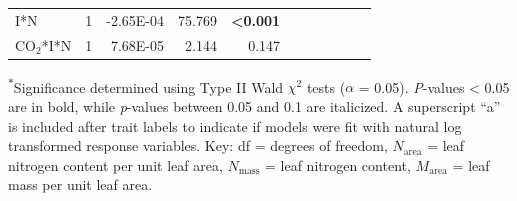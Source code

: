 \begin{landscape}
\begin{table}
{\begin{tabular}{p{3cm}p{0.5cm}p{1.75cm}p{1.5cm}p{1.5cm}p{1.75cm}p{1.5cm}p{1.5cm}p{1.75cm}p{1.5cm}p{1.5cm}}
            I*N & \multicolumn{1}{r}{1}
            & \multicolumn{1}{r}{-2.65E-04} & \multicolumn{1}{r}{ 75.769}   & \multicolumn{1}{r}{\textbf{<0.001}}
            & \multicolumn{1}{r}{}          & \multicolumn{1}{r}{}          & \multicolumn{1}{r}{}
            & \multicolumn{1}{r}{}          & \multicolumn{1}{r}{}          & \multicolumn{1}{r}{} 
            \\

            CO$_2$*I*N & \multicolumn{1}{r}{1}
            & \multicolumn{1}{r}{7.68E-05}  & \multicolumn{1}{r}{  2.144}   & \multicolumn{1}{r}{0.147}
            & \multicolumn{1}{r}{}          & \multicolumn{1}{r}{}          & \multicolumn{1}{r}{}
            & \multicolumn{1}{r}{}          & \multicolumn{1}{r}{}          & \multicolumn{1}{r}{} 
            \\
            \hline
    \end{tabular}}
    \label{tab:table5.1}
    \end{table}
\begin{singlespace}
    \noindent \textsuperscript{$*$}Significance determined using Type II Wald $\chi^{2}$ tests ($\alpha$ = 0.05). \textit{P}-values < 0.05 are in bold, while \textit{p}-values between 0.05 and 0.1 are italicized. A superscript “a” is included after trait labels to indicate if models were fit with natural log transformed response variables. Key: df = degrees of freedom, $N_\mathrm{area}$ = leaf nitrogen content per unit leaf area, $N_\mathrm{mass}$ = leaf nitrogen content, $M_\mathrm{area}$ = leaf mass per unit leaf area.
\end{singlespace}
\end{landscape}
\clearpage

